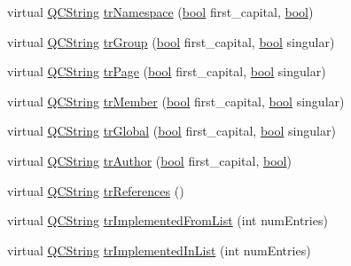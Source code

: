 \begin{DoxyCompactItemize}
\item 
virtual \hyperlink{class_q_c_string}{Q\+C\+String} \hyperlink{class_translator_indonesian_a60211c00aa2e822d2cd0164e1a1b356f}{tr\+Namespace} (\hyperlink{qglobal_8h_a1062901a7428fdd9c7f180f5e01ea056}{bool} first\+\_\+capital, \hyperlink{qglobal_8h_a1062901a7428fdd9c7f180f5e01ea056}{bool})
\item 
virtual \hyperlink{class_q_c_string}{Q\+C\+String} \hyperlink{class_translator_indonesian_a5a68b19dd94ff7338fdf36eeee7fecc6}{tr\+Group} (\hyperlink{qglobal_8h_a1062901a7428fdd9c7f180f5e01ea056}{bool} first\+\_\+capital, \hyperlink{qglobal_8h_a1062901a7428fdd9c7f180f5e01ea056}{bool} singular)
\item 
virtual \hyperlink{class_q_c_string}{Q\+C\+String} \hyperlink{class_translator_indonesian_a2c851db6ed6b27e0ca60eeac9b33d39d}{tr\+Page} (\hyperlink{qglobal_8h_a1062901a7428fdd9c7f180f5e01ea056}{bool} first\+\_\+capital, \hyperlink{qglobal_8h_a1062901a7428fdd9c7f180f5e01ea056}{bool} singular)
\item 
virtual \hyperlink{class_q_c_string}{Q\+C\+String} \hyperlink{class_translator_indonesian_a96bc220bf746c756e0656bdbbc247bce}{tr\+Member} (\hyperlink{qglobal_8h_a1062901a7428fdd9c7f180f5e01ea056}{bool} first\+\_\+capital, \hyperlink{qglobal_8h_a1062901a7428fdd9c7f180f5e01ea056}{bool} singular)
\item 
virtual \hyperlink{class_q_c_string}{Q\+C\+String} \hyperlink{class_translator_indonesian_ab4d7c8e6e27bc2470708ce83aace2856}{tr\+Global} (\hyperlink{qglobal_8h_a1062901a7428fdd9c7f180f5e01ea056}{bool} first\+\_\+capital, \hyperlink{qglobal_8h_a1062901a7428fdd9c7f180f5e01ea056}{bool} singular)
\item 
virtual \hyperlink{class_q_c_string}{Q\+C\+String} \hyperlink{class_translator_indonesian_ad5fb31ccc0813683f8c55812a64911c6}{tr\+Author} (\hyperlink{qglobal_8h_a1062901a7428fdd9c7f180f5e01ea056}{bool} first\+\_\+capital, \hyperlink{qglobal_8h_a1062901a7428fdd9c7f180f5e01ea056}{bool})
\item 
virtual \hyperlink{class_q_c_string}{Q\+C\+String} \hyperlink{class_translator_indonesian_afea4957c5161b3be74909568bd3fea75}{tr\+References} ()
\item 
virtual \hyperlink{class_q_c_string}{Q\+C\+String} \hyperlink{class_translator_indonesian_ab7d294f3dae9f3a210a495f76178dc80}{tr\+Implemented\+From\+List} (int num\+Entries)
\item 
virtual \hyperlink{class_q_c_string}{Q\+C\+String} \hyperlink{class_translator_indonesian_a90efe5f5bf9ae8bd1c0a36fd49b0aa21}{tr\+Implemented\+In\+List} (int num\+Entries)

\end{DoxyCompactItemize}
